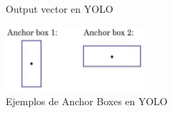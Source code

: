 \begin{figure}[p]
\begin{subfigure}[h!]{.5\textwidth}
        \caption{Output vector en YOLO}
    \end{subfigure}
    \begin{subfigure}[h!]{.6\textwidth}
        \raggedleft
        \includegraphics[width=\linewidth]{img/anchor-boxes-yolo-2.png}
        \caption{Ejemplos de Anchor Boxes en YOLO}
    \end{subfigure}
    \begin{subfigure}[h!]{.15\textwidth}
        \raggedright

\end{subfigure}
\end{figure}
